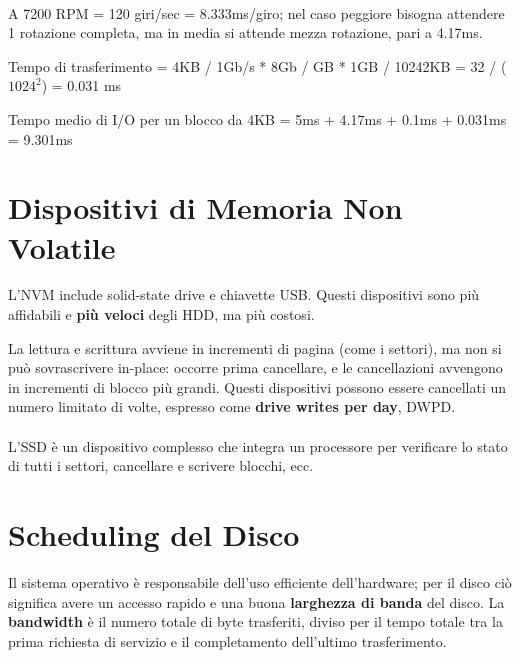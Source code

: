 \paragraph{}
A 7200 RPM = 120 giri/sec = 8.333ms/giro; nel caso peggiore bisogna attendere 1 rotazione completa, ma in media si attende mezza rotazione, pari a 4.17ms.


Tempo di trasferimento = 4KB / 1Gb/s * 8Gb / GB * 1GB / 10242KB = 32 / ($1024^2$) = 0.031 ms

Tempo medio di I/O per un blocco da 4KB = 5ms + 4.17ms + 0.1ms + 0.031ms = 9.301ms

\section{Dispositivi di Memoria Non Volatile}

L'NVM include solid-state drive e chiavette USB. Questi dispositivi sono più affidabili e \textbf{più veloci} degli HDD, ma più costosi.

La lettura e scrittura avviene in incrementi di pagina (come i settori), ma non si può sovrascrivere in-place: occorre prima cancellare, e le cancellazioni avvengono in incrementi di blocco più grandi. Questi dispositivi possono essere cancellati un numero limitato di volte, espresso come \textbf{drive writes per day}, DWPD.

\paragraph{}
L'SSD è un dispositivo complesso che integra un processore per verificare lo stato di tutti i settori, cancellare e scrivere blocchi, ecc.

\section{Scheduling del Disco}

Il sistema operativo è responsabile dell'uso efficiente dell'hardware; per il disco ciò significa avere un accesso rapido e una buona \textbf{larghezza di banda} del disco. La \textbf{bandwidth} è il numero totale di byte trasferiti, diviso per il tempo totale tra la prima richiesta di servizio e il completamento dell'ultimo trasferimento.

\paragraph{}

